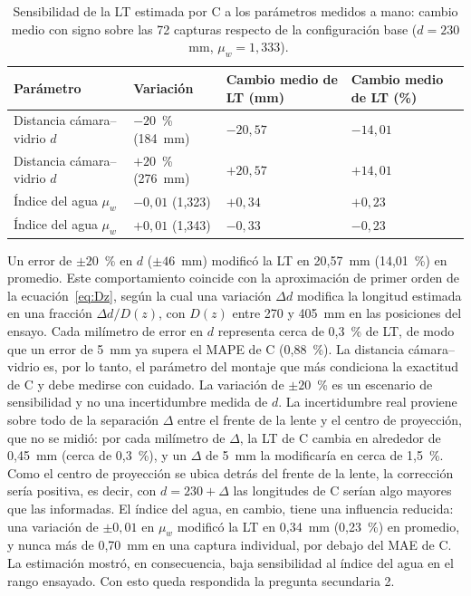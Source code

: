 \begin{table}[H]
\centering\footnotesize
\caption{Sensibilidad de la LT estimada por C a los parámetros medidos a mano: cambio medio con signo sobre las 72 capturas respecto de la configuración base ($d = 230$~mm, $\mu_w = 1{,}333$).}
\label{tab:sensibilidad}
\begin{tabular}{@{}p{4cm}p{2.6cm}p{2.8cm}p{2.8cm}@{}}
\toprule
Parámetro & Variación & Cambio medio de LT (mm) & Cambio medio de LT (\%) \\
\midrule
Distancia cámara--vidrio $d$ & $-20$~\% (184~mm) & $-20{,}57$ & $-14{,}01$ \\
Distancia cámara--vidrio $d$ & $+20$~\% (276~mm) & $+20{,}57$ & $+14{,}01$ \\
Índice del agua $\mu_w$ & $-0{,}01$ (1,323) & $+0{,}34$ & $+0{,}23$ \\
Índice del agua $\mu_w$ & $+0{,}01$ (1,343) & $-0{,}33$ & $-0{,}23$ \\
\bottomrule
\end{tabular}
\end{table}

Un error de $\pm 20$~\% en $d$ ($\pm 46$~mm) modificó la LT en 20,57~mm (14,01~\%) en promedio. Este comportamiento coincide con la aproximación de primer orden de la ecuación~\eqref{eq:Dz}, según la cual una variación $\Delta d$ modifica la longitud estimada en una fracción $\Delta d / D(z)$, con $D(z)$ entre 270 y 405~mm en las posiciones del ensayo. Cada milímetro de error en $d$ representa cerca de 0,3~\% de LT, de modo que un error de 5~mm ya supera el MAPE de C (0,88~\%). La distancia cámara--vidrio es, por lo tanto, el parámetro del montaje que más condiciona la exactitud de C y debe medirse con cuidado. La variación de $\pm 20$~\% es un escenario de sensibilidad y no una incertidumbre medida de $d$. La incertidumbre real proviene sobre todo de la separación $\Delta$ entre el frente de la lente y el centro de proyección, que no se midió: por cada milímetro de $\Delta$, la LT de C cambia en alrededor de 0,45~mm (cerca de 0,3~\%), y un $\Delta$ de 5~mm la modificaría en cerca de 1,5~\%. Como el centro de proyección se ubica detrás del frente de la lente, la corrección sería positiva, es decir, con $d = 230 + \Delta$ las longitudes de C serían algo mayores que las informadas. El índice del agua, en cambio, tiene una influencia reducida: una variación de $\pm 0{,}01$ en $\mu_w$ modificó la LT en 0,34~mm (0,23~\%) en promedio, y nunca más de 0,70~mm en una captura individual, por debajo del MAE de C. La estimación mostró, en consecuencia, baja sensibilidad al índice del agua en el rango ensayado. Con esto queda respondida la pregunta secundaria 2.

